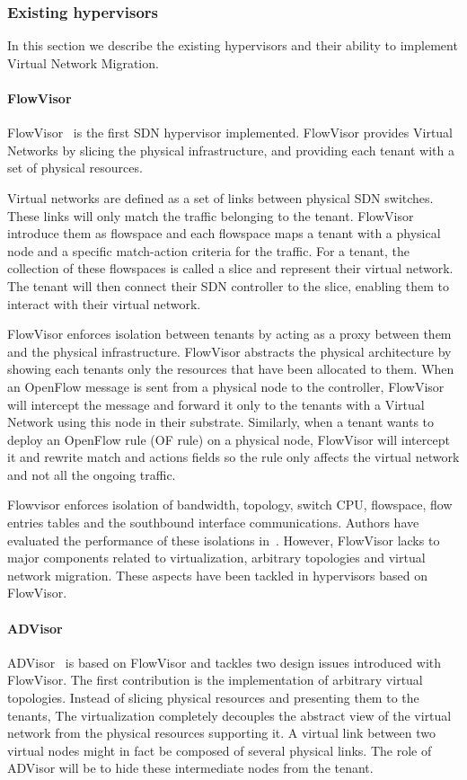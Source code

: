 \subsubsection{Existing hypervisors}
\label{sec:existing-nhv}
In this section we describe the existing hypervisors and their ability to implement Virtual Network Migration.

\paragraph{FlowVisor}

FlowVisor~\cite{FlowVisor-Sherwood2009} is the first SDN hypervisor implemented.
FlowVisor provides Virtual Networks by slicing the physical infrastructure, and providing each tenant with a set of physical resources.

Virtual networks are defined as a set of links between physical SDN switches.
These links will only match the traffic belonging to the tenant.
FlowVisor introduce them as flowspace and each flowspace maps a tenant with a physical node and a specific match-action criteria for the traffic.
For a tenant, the collection of these flowspaces is called a slice and represent their virtual network. 
The tenant will then connect their SDN controller to the slice, enabling them to interact with their virtual network.

FlowVisor enforces isolation between tenants by acting as a proxy between them and the physical infrastructure.
FlowVisor abstracts the physical architecture by showing each tenants only the resources that have been allocated to them.
When an OpenFlow message is sent from a physical node to the controller, FlowVisor will intercept the message and forward it only to the tenants with a Virtual Network using this node in their substrate.
Similarly, when a tenant wants to deploy an OpenFlow rule (OF rule) on a physical node, FlowVisor will intercept it and rewrite match and actions fields so the rule only affects the virtual network and not all the ongoing traffic.

Flowvisor enforces isolation of bandwidth, topology, switch CPU, flowspace, flow entries tables and the southbound interface communications. Authors have evaluated the performance of these isolations in~\cite{FlowVisor-Sherwood2009}.
However, FlowVisor lacks to major components related to virtualization, arbitrary topologies and virtual network migration.
These aspects have been tackled in hypervisors based on FlowVisor.

\paragraph{ADVisor}
ADVisor~\cite{ADVisor-Salvadori2012} is based on FlowVisor and tackles two design issues introduced with FlowVisor.
The first contribution is the implementation of arbitrary virtual topologies.
Instead of slicing physical resources and presenting them to the tenants, 
The virtualization completely decouples the abstract view of the virtual network from the physical resources supporting it.
A virtual link between two virtual nodes might in fact be composed of several physical links. The role of ADVisor will be to hide these intermediate nodes from the tenant.

